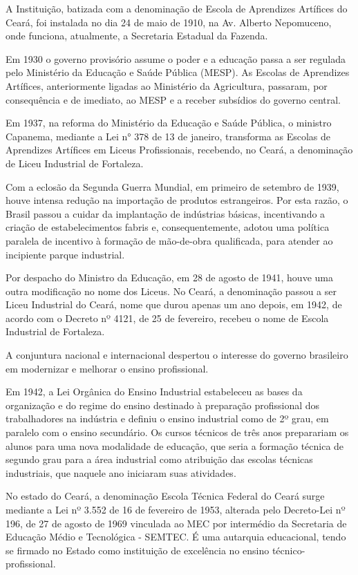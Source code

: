 \documentclass{paper}
\begin{document}
A Instituição, batizada com a denominação de Escola de Aprendizes Artífices do Ceará, foi instalada no dia 24 de maio de 1910, na Av. Alberto Nepomuceno, onde funciona, atualmente, a Secretaria Estadual da Fazenda.

Em 1930 o governo provisório assume o poder e a educação passa a ser regulada pelo Ministério da Educação e Saúde Pública (MESP). As Escolas de Aprendizes Artífices, anteriormente ligadas ao Ministério da Agricultura, passaram, por consequência e de imediato, ao MESP e a receber subsídios do governo central.

Em 1937, na reforma do Ministério da Educação e Saúde Pública, o ministro Capanema, mediante a Lei n° 378 de 13 de janeiro, transforma as Escolas de Aprendizes Artífices em Liceus Profissionais, recebendo, no Ceará, a denominação de Liceu Industrial de Fortaleza.

Com a eclosão da Segunda Guerra Mundial, em primeiro de setembro de 1939, houve intensa redução na importação de produtos estrangeiros. Por esta razão, o Brasil passou a cuidar da implantação de indústrias básicas, incentivando a criação de estabelecimentos fabris e, consequentemente, adotou uma política paralela de incentivo à formação de mão-de-obra qualificada, para atender ao incipiente parque industrial.

Por despacho do Ministro da Educação, em 28 de agosto de 1941, houve uma outra modificação no nome dos Liceus. No Ceará, a denominação passou a ser Liceu Industrial do Ceará, nome que durou apenas um ano depois, em 1942, de acordo com o Decreto nº 4121, de 25 de fevereiro, recebeu o nome de Escola Industrial de Fortaleza.

A conjuntura nacional e internacional despertou o interesse do governo brasileiro em modernizar e melhorar o ensino profissional.

Em 1942, a Lei Orgânica do Ensino Industrial estabeleceu as bases da organização e do regime do ensino destinado à preparação profissional dos trabalhadores na indústria e definiu o ensino industrial como de 2º grau, em paralelo com o ensino secundário. Os cursos técnicos de três anos preparariam os alunos para uma nova modalidade de educação, que seria a formação técnica de segundo grau para a área industrial como atribuição das escolas técnicas industriais, que
naquele ano iniciaram suas atividades.

No estado do Ceará, a denominação Escola Técnica Federal do Ceará surge mediante a Lei nº 3.552 de 16 de fevereiro de 1953, alterada pelo Decreto-Lei nº 196, de 27 de agosto de 1969 vinculada ao MEC por intermédio da Secretaria de Educação Médio e Tecnológica - SEMTEC. É uma autarquia educacional, tendo se firmado no Estado como instituição de excelência no ensino técnico-profissional.
\end{document}
